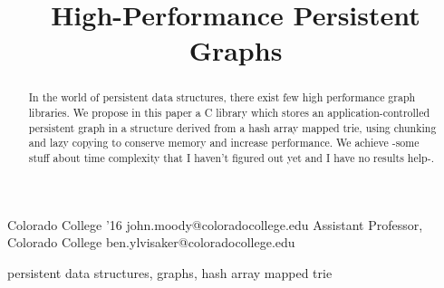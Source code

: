 \documentclass[preprint]{sigplanconf}
\begin{document}
\setlength{\pdfpageheight}{\paperheight}
\setlength{\pdfpagewidth}{\paperwidth}




\title{High-Performance Persistent Graphs}
\subtitle{}

           {Colorado College '16}
           {john.moody@coloradocollege.edu}
           {Assistant Professor, Colorado College}
           {ben.ylvisaker@coloradocollege.edu}

\maketitle


\begin{abstract}
In the world of persistent data structures, there exist few high performance graph libraries.
We propose in this paper a C library which stores an application-controlled persistent graph in a structure derived from a hash array mapped trie, using chunking and lazy copying to conserve memory and increase performance.
We achieve -some stuff about time complexity that I haven't figured out yet and I have no results help-.
\end{abstract}


\keywords
persistent data structures, graphs, hash array mapped trie
\end{document}
